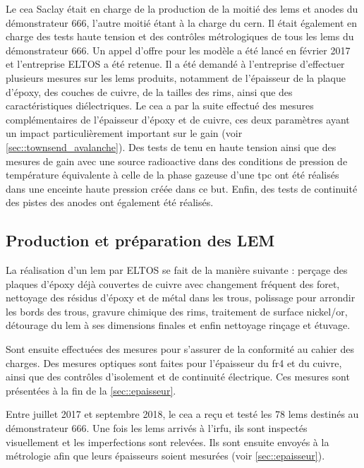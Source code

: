         Le \gls{cea} Saclay était en charge de la production de la moitié des \glspl{lem} et anodes du démonstrateur 666, l'autre moitié étant à la charge du \gls{cern}. Il était également en charge des tests haute tension et des contrôles métrologiques de tous les \glspl{lem} du démonstrateur 666. Un appel d'offre pour les modèle a été lancé en février 2017 et l'entreprise ELTOS a été retenue. Il a été demandé à l'entreprise d'effectuer plusieurs mesures sur les \glspl{lem} produits, notamment de l'épaisseur de la plaque d'époxy, des couches de cuivre, de la tailles des rims, ainsi que des caractéristiques diélectriques. Le \gls{cea} a par la suite effectué des mesures complémentaires de l'épaisseur d'époxy et de cuivre, ces deux paramètres ayant un impact particulièrement important sur le gain (voir \autoref{sec::townsend_avalanche}). Des tests de tenu en haute tension ainsi que des mesures de gain avec une source radioactive dans des conditions de pression de température équivalente à celle de la phase gazeuse d'une \gls{tpc} ont été réalisés dans une enceinte haute pression créée dans ce but. Enfin, des tests de continuité des pistes des anodes ont également été réalisés.
        
        \subsection{Production et préparation des LEM}
        
            La réalisation d'un \gls{lem} par ELTOS se fait de la manière suivante : perçage des plaques d'époxy déjà couvertes de cuivre avec changement fréquent des foret, nettoyage des résidus d'époxy et de métal dans les trous, polissage pour arrondir les bords des trous, gravure chimique des rims, traitement de surface nickel/or, détourage du \gls{lem} à ses dimensions finales et enfin nettoyage rinçage et étuvage.
                
            Sont ensuite effectuées des mesures pour s'assurer de la conformité au cahier des charges. Des mesures optiques sont faites pour l'épaisseur du \gls{fr4} et du cuivre, ainsi que des contrôles d'isolement et de continuité électrique. Ces mesures sont présentées à la fin de la \autoref{sec::epaisseur}.
            
            Entre juillet 2017 et septembre 2018, le \gls{cea} a reçu et testé les 78 \glspl{lem} destinés au démonstrateur 666. Une fois les \glspl{lem} arrivés à l'\gls{irfu}, ils sont inspectés visuellement et les imperfections sont relevées. Ils sont ensuite envoyés à la métrologie afin que leurs épaisseurs soient mesurées (voir \autoref{sec::epaisseur}).
            
